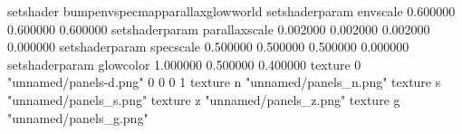 setshader bumpenvspecmapparallaxglowworld
setshaderparam envscale 0.600000 0.600000 0.600000
setshaderparam parallaxscale 0.002000 0.002000 0.002000 0.000000
setshaderparam specscale 0.500000 0.500000 0.500000 0.000000
setshaderparam glowcolor 1.000000 0.500000 0.400000
texture 0 "unnamed/panels-d.png" 0 0 0 1
texture n "unnamed/panels_n.png"
texture s "unnamed/panels_s.png"
texture z "unnamed/panels_z.png"
texture g "unnamed/panels_g.png"